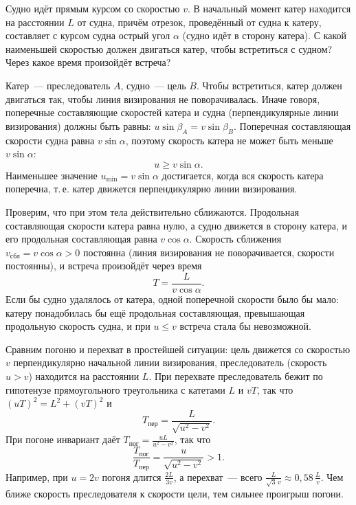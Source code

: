 \documentclass[../main.tex]{subfiles}
\begin{document}

\begin{example}
Судно идёт прямым курсом со скоростью $v$. В начальный момент катер находится на
расстоянии $L$ от судна, причём отрезок, проведённый от судна к катеру, составляет с
курсом судна острый угол $\alpha$ (судно идёт в сторону катера). С какой наименьшей
скоростью должен двигаться катер, чтобы встретиться с судном? Через какое время
произойдёт встреча?

Катер~--- преследователь $A$, судно~--- цель $B$. Чтобы встретиться, катер должен
двигаться так, чтобы линия визирования не поворачивалась. Иначе говоря, поперечные
составляющие скоростей катера и судна (перпендикулярные линии визирования) должны
быть равны: $u\sin\beta_A = v\sin\beta_B$. Поперечная составляющая скорости судна
равна $v\sin\alpha$, поэтому скорость катера не может быть меньше $v\sin\alpha$:
\[
u \geq v\sin\alpha.
\]
Наименьшее значение $u_{\min} = v\sin\alpha$ достигается, когда вся скорость катера
поперечна, т.\,е. катер движется перпендикулярно линии визирования.

Проверим, что при этом тела действительно сближаются. Продольная составляющая
скорости катера равна нулю, а судно движется в сторону катера, и его продольная
составляющая равна $v\cos\alpha$. Скорость сближения $v_{\text{сбл}} = v\cos\alpha > 0$
постоянна (линия визирования не поворачивается, скорости постоянны), и встреча
произойдёт через время
\[
T = \frac{L}{v\cos\alpha}.
\]
Если бы судно удалялось от катера, одной поперечной скорости было бы мало: катеру
понадобилась бы ещё продольная составляющая, превышающая продольную скорость судна,
и при $u \leq v$ встреча стала бы невозможной.
\end{example}

Сравним погоню и перехват в простейшей ситуации: цель движется со скоростью $v$
перпендикулярно начальной линии визирования, преследователь (скорость $u > v$)
находится на расстоянии $L$. При перехвате преследователь бежит по гипотенузе
прямоугольного треугольника с катетами $L$ и $vT$, так что $(uT)^2 = L^2 + (vT)^2$ и
\[
T_{\text{пер}} = \frac{L}{\sqrt{u^2 - v^2}}.
\]
При погоне инвариант даёт $T_{\text{пог}} = \frac{uL}{u^2 - v^2}$, так что
\[
\frac{T_{\text{пог}}}{T_{\text{пер}}} = \frac{u}{\sqrt{u^2 - v^2}} > 1.
\]
Например, при $u = 2v$ погоня длится $\frac{2L}{3v}$, а перехват~--- всего
$\frac{L}{\sqrt{3}\,v} \approx 0{,}58\,\frac{L}{v}$. Чем ближе скорость
преследователя к скорости цели, тем сильнее проигрыш погони.
\end{document}
